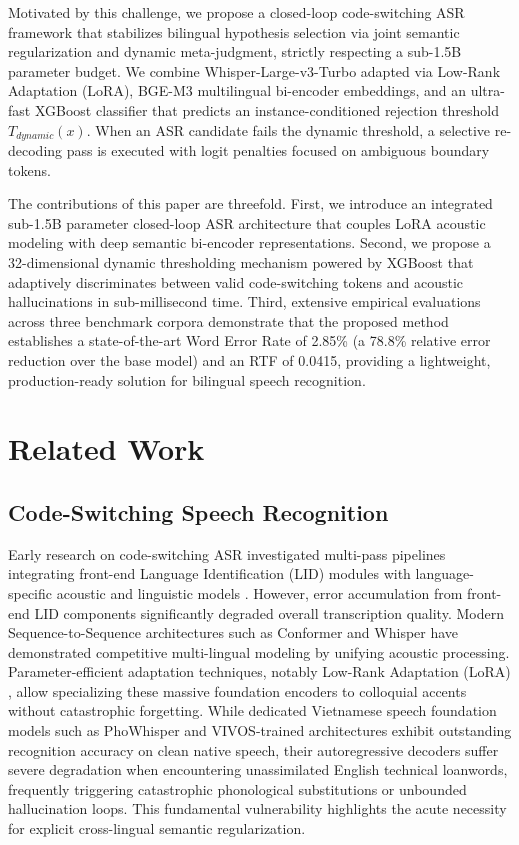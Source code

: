 \documentclass[9pt, conference, a4paper, compsocconf]{IEEEtran}
\begin{document}
Motivated by this challenge, we propose a closed-loop code-switching ASR framework that stabilizes bilingual hypothesis selection via joint semantic regularization and dynamic meta-judgment, strictly respecting a sub-1.5B parameter budget. We combine Whisper-Large-v3-Turbo adapted via Low-Rank Adaptation (LoRA), BGE-M3 multilingual bi-encoder embeddings, and an ultra-fast XGBoost classifier that predicts an instance-conditioned rejection threshold $T_{dynamic}(x)$. When an ASR candidate fails the dynamic threshold, a selective re-decoding pass is executed with logit penalties focused on ambiguous boundary tokens.

The contributions of this paper are threefold. First, we introduce an integrated sub-1.5B parameter closed-loop ASR architecture that couples LoRA acoustic modeling with deep semantic bi-encoder representations. Second, we propose a 32-dimensional dynamic thresholding mechanism powered by XGBoost that adaptively discriminates between valid code-switching tokens and acoustic hallucinations in sub-millisecond time. Third, extensive empirical evaluations across three benchmark corpora demonstrate that the proposed method establishes a state-of-the-art Word Error Rate of 2.85\% (a 78.8\% relative error reduction over the base model) and an RTF of 0.0415, providing a lightweight, production-ready solution for bilingual speech recognition.

\section{Related Work}

\subsection{Code-Switching Speech Recognition}
Early research on code-switching ASR investigated multi-pass pipelines integrating front-end Language Identification (LID) modules with language-specific acoustic and linguistic models \cite{sitaram2020survey}. However, error accumulation from front-end LID components significantly degraded overall transcription quality. Modern Sequence-to-Sequence architectures such as Conformer \cite{gulati2020conformer} and Whisper \cite{radford2023whisper} have demonstrated competitive multi-lingual modeling by unifying acoustic processing. Parameter-efficient adaptation techniques, notably Low-Rank Adaptation (LoRA) \cite{hu2022lora}, allow specializing these massive foundation encoders to colloquial accents without catastrophic forgetting. While dedicated Vietnamese speech foundation models such as PhoWhisper \cite{nguyen2024phowhisper} and VIVOS-trained architectures \cite{luong2016vivos} exhibit outstanding recognition accuracy on clean native speech, their autoregressive decoders suffer severe degradation when encountering unassimilated English technical loanwords, frequently triggering catastrophic phonological substitutions or unbounded hallucination loops. This fundamental vulnerability highlights the acute necessity for explicit cross-lingual semantic regularization.
\end{document}

